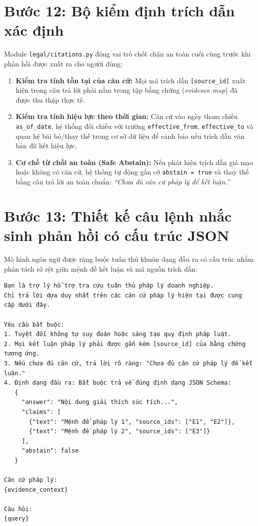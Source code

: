 \section{Bước 12: Bộ kiểm định trích dẫn xác định}

Module \texttt{legal/citations.py} đóng vai trò chốt chặn an toàn cuối cùng trước khi phản hồi được xuất ra cho người dùng:
\begin{enumerate}
    \item \textbf{Kiểm tra tính tồn tại của căn cứ:} Mọi mã trích dẫn \texttt{[source\_id]} xuất hiện trong câu trả lời phải nằm trong tập bằng chứng (\textit{evidence map}) đã được thu thập thực tế.
    \item \textbf{Kiểm tra tính hiệu lực theo thời gian:} Căn cứ vào ngày tham chiếu \texttt{as\_of\_date}, hệ thống đối chiếu với trường \texttt{effective\_from}, \texttt{effective\_to} và quan hệ bãi bỏ/thay thế trong cơ sở dữ liệu để cảnh báo nếu trích dẫn văn bản đã hết hiệu lực.
    \item \textbf{Cơ chế từ chối an toàn (Safe Abstain):} Nếu phát hiện trích dẫn giả mạo hoặc không có căn cứ, hệ thống tự động gắn cờ \texttt{abstain = true} và thay thế bằng câu trả lời an toàn chuẩn: \textit{“Chưa đủ căn cứ pháp lý để kết luận.”}
\end{enumerate}

\section{Bước 13: Thiết kế câu lệnh nhắc sinh phản hồi có cấu trúc JSON}

Mô hình ngôn ngữ được ràng buộc tuân thủ khuôn dạng đầu ra có cấu trúc nhằm phân tách rõ rệt giữa mệnh đề kết luận và mã nguồn trích dẫn:

\begin{lstlisting}[caption={Câu lệnh nhắc sinh câu trả lời có cấu trúc nghiêm ngặt}]
Bạn là trợ lý hỗ trợ tra cứu tuân thủ pháp lý doanh nghiệp.
Chỉ trả lời dựa duy nhất trên các căn cứ pháp lý hiện tại được cung cấp dưới đây.

Yêu cầu bắt buộc:
1. Tuyệt đối không tự suy đoán hoặc sáng tạo quy định pháp luật.
2. Mọi kết luận pháp lý phải được gắn kèm [source_id] của bằng chứng tương ứng.
3. Nếu chưa đủ căn cứ, trả lời rõ ràng: "Chưa đủ căn cứ pháp lý để kết luận."
4. Định dạng đầu ra: Bắt buộc trả về đúng định dạng JSON Schema:
   {
     "answer": "Nội dung giải thích súc tích...",
     "claims": [
       {"text": "Mệnh đề pháp lý 1", "source_ids": ["E1", "E2"]},
       {"text": "Mệnh đề pháp lý 2", "source_ids": ["E3"]}
     ],
     "abstain": false
   }

Căn cứ pháp lý:
{evidence_context}

Câu hỏi:
{query}
\end{lstlisting}

